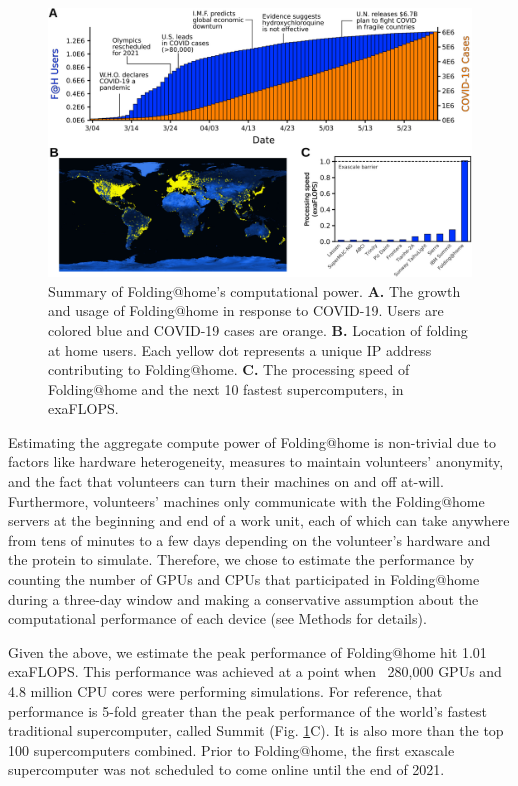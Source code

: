 \documentclass[../main.tex]{subfiles}
\begin{document}
        \begin{figure}[!htb] %
            \centering
            \includegraphics[width=\linewidth]{ch7-fig1.png}
            \caption[Summary of Folding@home’s computational power.]
                {Summary of Folding@home’s computational power. \textbf{A.} The growth and usage of Folding@home in response to COVID-19. Users are colored blue and COVID-19 cases are orange. \textbf{B.} Location of folding at home users. Each yellow dot represents a unique IP address contributing to Folding@home. \textbf{C.} The processing speed of Folding@home and the next 10 fastest supercomputers, in exaFLOPS.}
            \label{fig:ch7-fig1}
        \end{figure}

        Estimating the aggregate compute power of Folding@home is non-trivial due to factors like hardware heterogeneity, measures to maintain volunteers’ anonymity, and the fact that volunteers can turn their machines on and off at-will. Furthermore, volunteers’ machines only communicate with the Folding@home servers at the beginning and end of a work unit, each of which can take anywhere from tens of minutes to a few days depending on the volunteer’s hardware and the protein to simulate. Therefore, we chose to estimate the performance by counting the number of GPUs and CPUs that participated in Folding@home during a three-day window and making a conservative assumption about the computational performance of each device (see Methods for details).

        Given the above, we estimate the peak performance of Folding@home hit 1.01 exaFLOPS. This performance was achieved at a point when ~280,000 GPUs and 4.8 million CPU cores were performing simulations. For reference, that performance is 5-fold greater than the peak performance of the world’s fastest traditional supercomputer, called Summit (Fig. \ref{fig:ch7-fig1}C). It is also more than the top 100 supercomputers combined. Prior to Folding@home, the first exascale supercomputer was not scheduled to come online until the end of 2021.
\end{document}
